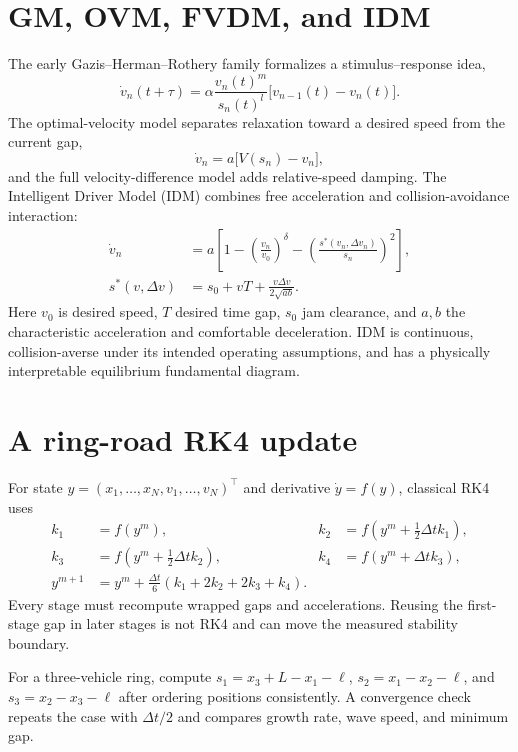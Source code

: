 \documentclass[11pt,a4paper,openany]{book}
\numberwithin{equation}{chapter}
\numberwithin{figure}{chapter}
\numberwithin{table}{chapter}
\begin{document}
\section{GM, OVM, FVDM, and IDM}
The early Gazis--Herman--Rothery family formalizes a stimulus--response idea,
\begin{equation}
\dot v_n(t+\tau)=\alpha\frac{v_n(t)^m}{s_n(t)^l}\bigl[v_{n-1}(t)-v_n(t)\bigr].
\end{equation}
The optimal-velocity model separates relaxation toward a desired speed from the current gap,
\begin{equation}
\dot v_n=a\bigl[V(s_n)-v_n\bigr],
\end{equation}
and the full velocity-difference model adds relative-speed damping. The Intelligent Driver Model (IDM) combines free acceleration and collision-avoidance interaction:
\begin{align}
\dot v_n&=a\left[1-\left(\frac{v_n}{v_0}\right)^\delta-\left(\frac{s^*(v_n,\Delta v_n)}{s_n}\right)^2\right],\\
s^*(v,\Delta v)&=s_0+vT+\frac{v\Delta v}{2\sqrt{ab}}.
\end{align}
Here $v_0$ is desired speed, $T$ desired time gap, $s_0$ jam clearance, and $a,b$ the characteristic acceleration and comfortable deceleration. IDM is continuous, collision-averse under its intended operating assumptions, and has a physically interpretable equilibrium fundamental diagram.

\section{A ring-road RK4 update}
For state $y=(x_1,\ldots,x_N,v_1,\ldots,v_N)^\top$ and derivative $\dot y=f(y)$, classical RK4 uses
\begin{align}
k_1&=f(y^m),&k_2&=f(y^m+\tfrac12\Delta t k_1),\\
k_3&=f(y^m+\tfrac12\Delta t k_2),&k_4&=f(y^m+\Delta t k_3),\\
y^{m+1}&=y^m+\frac{\Delta t}{6}(k_1+2k_2+2k_3+k_4).
\end{align}
Every stage must recompute wrapped gaps and accelerations. Reusing the first-stage gap in later stages is not RK4 and can move the measured stability boundary.

For a three-vehicle ring, compute $s_1=x_3+L-x_1-\ell$, $s_2=x_1-x_2-\ell$, and $s_3=x_2-x_3-\ell$ after ordering positions consistently. A convergence check repeats the case with $\Delta t/2$ and compares growth rate, wave speed, and minimum gap.
\end{document}
